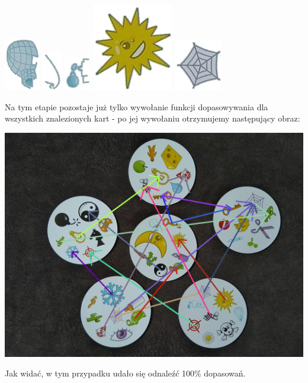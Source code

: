 \documentclass[10pt,a4paper]{article}
\begin{document}
\begin{center}
\includegraphics[scale=0.5]{2.1/card0sign4.jpg}
\includegraphics[scale=0.5]{2.1/card0sign5.jpg}
\includegraphics[scale=0.5]{2.1/card0sign6.jpg}
\includegraphics[scale=0.5]{2.1/card0sign7.jpg}
\includegraphics[scale=0.5]{2.1/card0sign8.jpg}
\end{center}

\newpage
Na tym etapie pozostaje już tylko wywołanie funkcji dopasowywania dla wszystkich znalezionych kart - po jej wywołaniu otrzymujemy następujący obraz:
\begin{center}
\includegraphics[scale=0.25]{2.1/img_arrows0.jpg}
\end{center}
Jak widać, w tym przypadku udało się odnaleźć 100\% dopasowań.
\end{document}

